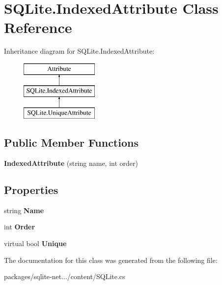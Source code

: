 \hypertarget{classSQLite_1_1IndexedAttribute}{}\section{S\+Q\+Lite.\+Indexed\+Attribute Class Reference}
\label{classSQLite_1_1IndexedAttribute}
Inheritance diagram for S\+Q\+Lite.\+Indexed\+Attribute\+:\begin{figure}[H]
\begin{center}
\leavevmode
\includegraphics[height=3.000000cm]{classSQLite_1_1IndexedAttribute}
\end{center}
\end{figure}
\subsection*{Public Member Functions}
\begin{DoxyCompactItemize}
\item 
\hypertarget{classSQLite_1_1IndexedAttribute_a6d43155fc211d6c76d27326c66c39752}{}{\bfseries Indexed\+Attribute} (string name, int order)\label{classSQLite_1_1IndexedAttribute_a6d43155fc211d6c76d27326c66c39752}

\end{DoxyCompactItemize}
\subsection*{Properties}
\begin{DoxyCompactItemize}
\item 
\hypertarget{classSQLite_1_1IndexedAttribute_a55689d97d0aca7c218c9677b2ddf2dd0}{}string {\bfseries Name}\label{classSQLite_1_1IndexedAttribute_a55689d97d0aca7c218c9677b2ddf2dd0}

\item 
\hypertarget{classSQLite_1_1IndexedAttribute_a5d6a42950339c3ae6060c1065467277a}{}int {\bfseries Order}\label{classSQLite_1_1IndexedAttribute_a5d6a42950339c3ae6060c1065467277a}

\item 
\hypertarget{classSQLite_1_1IndexedAttribute_a081cfea90b6aba263fb1b02c4897638a}{}virtual bool {\bfseries Unique}\label{classSQLite_1_1IndexedAttribute_a081cfea90b6aba263fb1b02c4897638a}

\end{DoxyCompactItemize}


The documentation for this class was generated from the following file\+:\begin{DoxyCompactItemize}
\item 
packages/sqlite-\/net.../content/S\+Q\+Lite.\+cs\end{DoxyCompactItemize}
